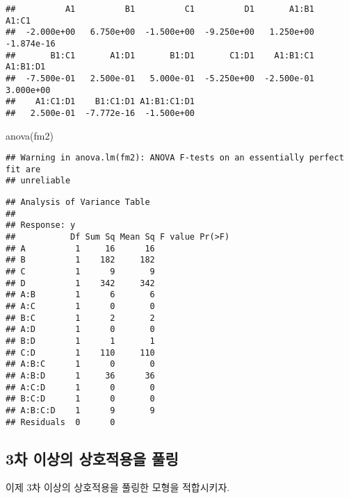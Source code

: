 \documentclass[
]{book}
\newenvironment{Shaded}{\begin{snugshade}}{\end{snugshade}}
\newcommand{\FunctionTok}[1]{\textcolor[rgb]{0.00,0.00,0.00}{#1}}
\newcommand{\NormalTok}[1]{#1}
\begin{document}
\begin{verbatim}
##          A1          B1          C1          D1       A1:B1       A1:C1 
##  -2.000e+00   6.750e+00  -1.500e+00  -9.250e+00   1.250e+00  -1.874e-16 
##       B1:C1       A1:D1       B1:D1       C1:D1    A1:B1:C1    A1:B1:D1 
##  -7.500e-01   2.500e-01   5.000e-01  -5.250e+00  -2.500e-01   3.000e+00 
##    A1:C1:D1    B1:C1:D1 A1:B1:C1:D1 
##   2.500e-01  -7.772e-16  -1.500e+00
\end{verbatim}

\begin{Shaded}
\begin{Highlighting}[]
\FunctionTok{anova}\NormalTok{(fm2)}
\end{Highlighting}
\end{Shaded}

\begin{verbatim}
## Warning in anova.lm(fm2): ANOVA F-tests on an essentially perfect fit are
## unreliable
\end{verbatim}

\begin{verbatim}
## Analysis of Variance Table
## 
## Response: y
##           Df Sum Sq Mean Sq F value Pr(>F)
## A          1     16      16               
## B          1    182     182               
## C          1      9       9               
## D          1    342     342               
## A:B        1      6       6               
## A:C        1      0       0               
## B:C        1      2       2               
## A:D        1      0       0               
## B:D        1      1       1               
## C:D        1    110     110               
## A:B:C      1      0       0               
## A:B:D      1     36      36               
## A:C:D      1      0       0               
## B:C:D      1      0       0               
## A:B:C:D    1      9       9               
## Residuals  0      0
\end{verbatim}

\hypertarget{uxcc28-uxc774uxc0c1uxc758-uxc0c1uxd638uxc801uxc6a9uxc744-uxd480uxb9c1}{%
\subsection{3차 이상의 상호적용을 풀링}\label{uxcc28-uxc774uxc0c1uxc758-uxc0c1uxd638uxc801uxc6a9uxc744-uxd480uxb9c1}}

이제 3차 이상의 상호적용을 풀링한 모형을 적합시키자.
\end{document}
